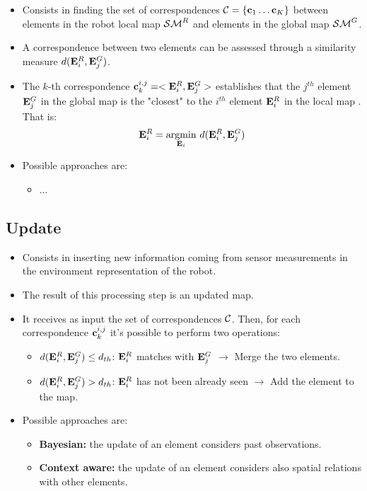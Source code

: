 \documentclass{article}
\begin{document}
	\begin{itemize}
		\item Consists in finding the set of correspondences $\mathcal{C} = \{\mathbf{c}_1 \dots \mathbf{c}_K\}$ between elements in the robot local map $\mathcal{SM}^R$ and elements in the global map $\mathcal{SM}^G$.
		\item A correspondence between two elements can be assessed through a similarity measure $d(\mathbf{E}_i^R,\mathbf{E}_j^G)$.
		\item The $k$-th correspondence $\mathbf{c}^{i,j}_k = <\mathbf{E}_i^R,\mathbf{E}_j^G>$ establishes that the $j^{th}$ element $\mathbf{E}_j^G$ in the global map is the "closest" to the $i^{th}$ element $\mathbf{E}_i^R$ in the local map . That is:
		\begin{equation}
			\mathbf{E}_i^R = \operatorname*{argmin}_{\mathbf{E}_i} \, d(\mathbf{E}_i^R,\mathbf{E}_j^G)
		\end{equation} 
		\item Possible approaches are:
		\begin{itemize}
			\item $\dots$
		\end{itemize}
	\end{itemize}
	
	\subsection{Update}
	
	\begin{itemize}
		\item Consists in inserting new information coming from sensor measurements in the environment representation of the robot.
		\item The result of this processing step is an updated map.
		\item It receives as input the set of correspondences $\mathcal{C}$. Then, for each correspondence $\mathbf{c}^{i,j}_k$ it's possible to perform two operations:
		\begin{itemize}
			\item $d(\mathbf{E}_i^R,\mathbf{E}_j^G) \leq d_{th}$: $\mathbf{E}_i^R$ matches with $\mathbf{E}_j^G$ $\rightarrow$ Merge the two elements.
			\item $d(\mathbf{E}_i^R,\mathbf{E}_j^G) > d_{th}$: $\mathbf{E}_i^R$ has not been already seen $\rightarrow$ Add the element to the map.
		\end{itemize}
		\item Possible approaches are:
		\begin{itemize}
			\item {\bf Bayesian:} the update of an element considers past observations.
			\item {\bf Context aware:} the update of an element considers also spatial relations with other elements.
		\end{itemize}
	\end{itemize}
	
\end{document}
